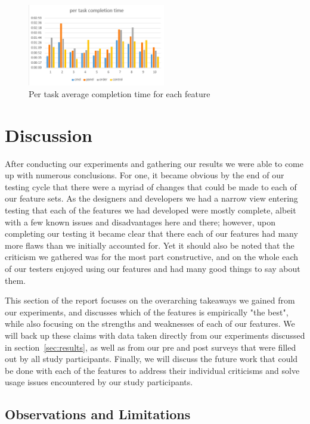 \documentclass{acm_proc_article-sp}
\begin{document}
\begin{figure}[h]
\centering
\includegraphics[width=6cm]{per_task_avg}
\caption{Per task average completion time for each feature}
\label{fig:per-avg-time}
\end{figure}


\section{Discussion}\label{sec:discussion}

After conducting our experiments and gathering our results we were able to come up with numerous conclusions. For one, it became obvious by the end of our testing cycle that there were a myriad of changes that could be made to each of our feature sets. As the designers and developers we had a narrow view entering testing that each of the features we had developed were mostly complete, albeit with a few known issues and disadvantages here and there; however, upon completing our testing it became clear that there each of our features had many more flaws than we initially accounted for. Yet it should also be noted that the criticism we gathered was for the most part constructive, and on the whole each of our testers enjoyed using our features and had many good things to say about them. 

This section of the report focuses on the overarching takeaways we gained from our experiments, and discusses which of the features is empirically "the best", while also focusing on the strengths and weaknesses of each of our features. We will back up these claims with data taken directly from our experiments discussed in section~\ref{sec:results}, as well as from our pre and post surveys that were filled out by all study participants. Finally, we will discuss the future work that could be done with each of the features to address their individual criticisms and solve usage issues encountered by our study participants.

\subsection{Observations and Limitations}
\end{document}
